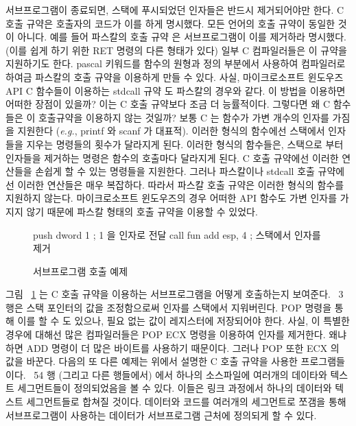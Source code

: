 서브프로그램이 종료되면, 스택에 푸시되었던 인자들은 반드시 제거되어야만
한다. C 호출 규약은 호출자의 코드가 이를 하게 명시했다. 
모든 언어의 호출 규약이 동일한 것이 아니다. 예를 들어 파스칼의 호출 규약 
은 서브프로그램이 이를 제거하라 명시했다. (이를 쉽게 하기 위한 RET 명령의 다른 형태가 있다)
일부 C 컴파일러들은 이 규약을 지원하기도 한다. {\code pascal} 키워드를 
함수의 원형과 정의 부분에서 사용하여 컴파일러로 하여금 파스칼의 호출 규약을 
이용하게 만들 수 있다. 사실, 마이크로소프트 윈도우즈 API C 함수들이 
이용하는 {\code stdcall} 규약  도 파스칼의 경우와 같다.
이 방법을 이용하면 어떠한 장점이 있을까? 이는 C 호출 규약보다 조금 더 능률적이다. 
그렇다면 왜 C 함수들은 이 호출규약을 이용하지 않는 것일까? 
보통 C 는 함수가 가변 개수의 인자를 가짐을 지원한다 (\emph{e.g.}, {\code printf}
와 {\code scanf} 가 대표적). 이러한 형식의 함수에선 스택에서 인자들을 
지우는 명령들의 횟수가 달라지게 된다. 
이러한 형식의 함수들은, 스택으로 부터 인자들을 제거하는 명령은 함수의 호출마다 
달라지게 된다. C 호출 규약에선 이러한 연산들을 손쉽게 할 수 있는 명령들을 지원한다. 그러나 
파스칼이나 stdcall 호출 규약에선 이러한 연산들은 매우 복잡하다. 
따라서 파스칼 호출 규약은 이러한 형식의 함수를 지원하지 않는다.
마이크로소프트 윈도우즈의 경우 어떠한 API
함수도 가변 인자를 가지지 않기 때문에 파스칼 형태의 호출 규약을 이용할 수 있었다. 


\begin{figure}[t]
\begin{AsmCodeListing}[frame=single]
      push   dword 1        ; 1 을 인자로 전달
      call   fun
      add    esp, 4         ; 스택에서 인자를 제거
\end{AsmCodeListing}
\caption{서브프로그램 호출 예제\label{fig:subcall}}
\end{figure}

그림 ~\ref{fig:subcall} 는 C 호출 규약을 이용하는 서브프로그램을
어떻게 호출하는지 보여준다. ~3행은 스택 포인터의 값을 조정함으로써 인자를 스택에서
지워버린다. {\code POP} 명령을 통해 이를 할 수 도 있으나, 필요 없는 값이 레지스터에
저장되어야 한다. 사실, 이 특별한 경우에 대해선 많은 컴파일러들은 
{\code POP ECX} 명령을 이용하여 인자를 제거한다. 왜냐하면 {\code ADD} 명령이 더 많은 바이트를
사용하기 때문이다. 그러나 {\code POP} 또한 ECX 의 값을 바꾼다. 다음의 또 다른 예제는 
위에서 설명한 C 호출 규약을 사용한 프로그램들이다. ~54 행 (그리고 다른 행들에서) 에서 
하나의 소스파일에 여러개의 데이타와 텍스트 세그먼트들이 정의되었음을
볼 수 있다. 이들은 링크 과정에서 하나의 데이터와 텍스트 세그먼트들로 합쳐질 것이다. 
데이터와 코드를 여러개의 세그먼트로 쪼갬을 통해 서브프로그램이 사용하는 데이터가
서브프로그램 근처에 정의되게 할 수 있다. 

